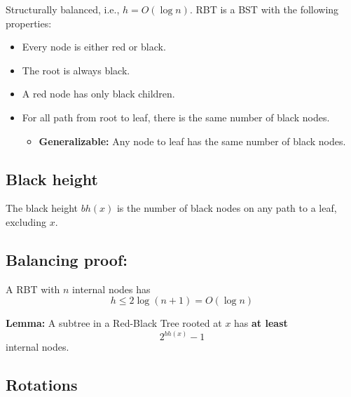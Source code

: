 \documentclass{article}
\begin{document}
\begin{definition}
    Structurally balanced, i.e., \( h = O(\log n) \). RBT is a BST with the following properties:
    \begin{itemize}
        \item Every node is either red or black.
        \item The root is always black.
        \item A red node has only black children.
        \item For all path from root to leaf, there is the same number of black nodes.
        \begin{itemize}
            \item \textbf{Generalizable:} Any node to leaf has the same number of black nodes. 
        \end{itemize}
    \end{itemize}
\end{definition}

\subsection{Black height}
\begin{definition}
    The black height \( bh(x) \) is the number of black nodes on any path to a leaf, excluding \( x \).
\end{definition}

\subsection{Balancing proof:}
\begin{theorem}
    A RBT with \( n \) internal nodes has 
    \begin{equation}
        h \leq 2 \log(n+1) = O(\log n)
    \end{equation}
\end{theorem}

\begin{theorem}
    \textbf{Lemma:} A subtree in a Red-Black Tree rooted at \( x \) has \textbf{at least}
    \begin{equation}
        2^{bh(x)} - 1
    \end{equation}
    internal nodes.
\end{theorem}

\subsection{Rotations}
\end{document}
